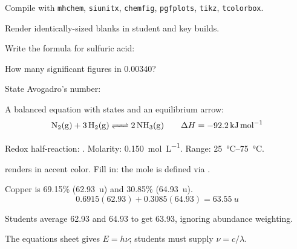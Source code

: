 \documentclass{apchem-notes}
\begin{document}
\apctitleblock


\begin{objectives}
  \item Compile with \texttt{mhchem}, \texttt{siunitx}, \texttt{chemfig},
        \texttt{pgfplots}, \texttt{tikz}, \texttt{tcolorbox}.
  \item Render identically-sized blanks in student and key builds.
\end{objectives}


\begin{warmup}[3]
  \item Write the formula for sulfuric acid: 
  \item How many significant figures in \num{0.00340}? 
  \item State Avogadro's number: 
\end{warmup}



A balanced equation with states and an equilibrium arrow:
\[ \ce{N2(g) + 3 H2(g) <=> 2 NH3(g)} \qquad
   \Delta H = \SI{-92.2}{\kilo\joule\per\mole} \]

Redox half-reaction: .
Molarity: \SI{0.150}{\mol\per\liter}. Range: \SIrange{25}{75}{\celsius}.

 renders in accent color. Fill in:
the mole is defined via .

\begin{workedexample}
  Copper is 69.15\%  (\SI{62.93}{u}) and 30.85\% 
  (\SI{64.93}{u}).
  \[ 0.6915(62.93) + 0.3085(64.93) = \SI{63.55}{u} \]
\end{workedexample}

\begin{apctrap}
  Students average 62.93 and 64.93 to get 63.93, ignoring abundance weighting.
\end{apctrap}

\begin{apcnote}
  The equations sheet gives $E = h\nu$; students must supply $\nu = c/\lambda$.
\end{apcnote}
\end{document}
